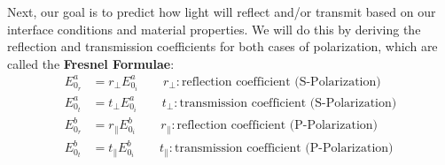 \documentclass[12pt]{article}
\begin{document}
Next, our goal is to predict how light will reflect and/or transmit based on our interface conditions and material properties. We will do this by deriving the reflection and transmission coefficients for both cases of polarization, which are called the \textbf{Fresnel Formulae}:
\[\begin{aligned}
E_{0_r}^a &= r_{\perp} E_{0_i}^a \qquad r_{\perp} : \text{reflection coefficient (S-Polarization)}\\ 
E_{0_t}^a &= t_{\perp} E_{0_i}^a \qquad t_{\perp} : \text{transmission coefficient (S-Polarization)}\\
E_{0_r}^b &= r_{\parallel} E_{0_i}^b \qquad r_{\parallel} : \text{reflection coefficient (P-Polarization)}\\
E_{0_t}^b &= t_{\parallel} E_{0_i}^b \qquad t_{\parallel} : \text{transmission coefficient (P-Polarization)}
\end{aligned}\]
\end{document}
